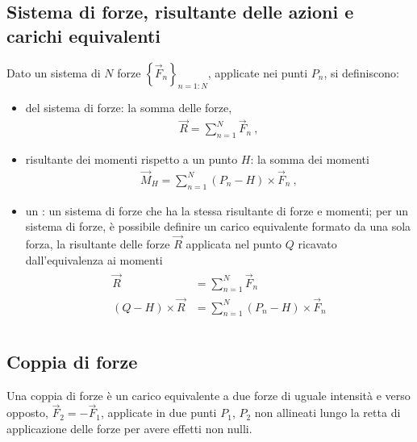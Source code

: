 \documentclass[letterpaper,10pt,italian]{jupyterBook}
\begin{document}
\subsection{Sistema di forze, risultante delle azioni e carichi equivalenti}
\label{\detokenize{ch/mechanics/actions-types:sistema-di-forze-risultante-delle-azioni-e-carichi-equivalenti}}\label{\detokenize{ch/mechanics/actions-types:physics-hs-mechanics-actions-def-equivalent}}
\sphinxAtStartPar
Dato un sistema di \(N\) forze \(\left\{ \vec{F}_n \right\}_{n=1:N}\), applicate nei punti \(P_n\), si definiscono:
\begin{itemize}
\item {} 
\sphinxAtStartPar
{} del sistema di forze: la somma delle forze,
\begin{equation*}
\begin{split}\vec{R} = \sum_{n=1}^{N} \vec{F}_n \ ,\end{split}
\end{equation*}
\item {} 
\sphinxAtStartPar
risultante dei momenti rispetto a un punto \(H\): la somma dei momenti
\begin{equation*}
\begin{split}\vec{M}_H = \sum_{n=1}^{N} (P_n - H) \times \vec{F}_n \ ,\end{split}
\end{equation*}
\item {} 
\sphinxAtStartPar
un : un sistema di forze che ha la stessa risultante di forze e momenti; per un sistema di forze, è possibile definire un carico equivalente formato da una sola forza, la risultante delle forze \(\vec{R}\) applicata nel punto \(Q\) ricavato dall’equivalenza ai momenti
\begin{equation*}
\begin{split}\begin{aligned}
    \vec{R} & = \sum_{n=1}^{N} \vec{F}_n \\
    (Q - H) \times \vec{R} & = \sum_{n=1}^{N} (P_n - H) \times \vec{F}_n \\
  \end{aligned}\end{split}
\end{equation*}
\end{itemize}


\subsection{Coppia di forze}
\label{\detokenize{ch/mechanics/actions-types:coppia-di-forze}}\label{\detokenize{ch/mechanics/actions-types:physics-hs-mechanics-actions-def-torque}}
\sphinxAtStartPar
Una coppia di forze è un carico equivalente a due forze di uguale intensità e verso opposto, \(\vec{F}_2 = - \vec{F}_1\), applicate in due punti \(P_1\), \(P_2\) non allineati lungo la retta di applicazione delle forze per avere effetti non nulli.
\end{document}
